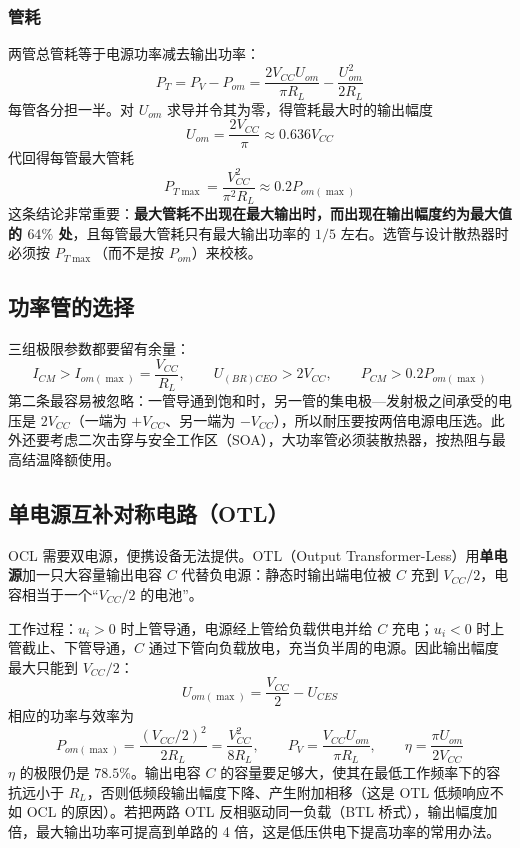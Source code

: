 \subsubsection{管耗}
两管总管耗等于电源功率减去输出功率：
\begin{equation}
P_T=P_V-P_{om}=\frac{2V_{CC}U_{om}}{\pi R_L}-\frac{U_{om}^2}{2R_L}
\end{equation}
每管各分担一半。对 $U_{om}$ 求导并令其为零，得管耗最大时的输出幅度
\begin{equation}
U_{om}=\frac{2V_{CC}}{\pi}\approx0.636V_{CC}
\end{equation}
代回得每管最大管耗
\begin{equation}
P_{T\max}=\frac{V_{CC}^2}{\pi^2R_L}\approx0.2P_{om(\max)}
\end{equation}
这条结论非常重要：\textbf{最大管耗不出现在最大输出时，而出现在输出幅度约为最大值的 $64\%$ 处}，且每管最大管耗只有最大输出功率的 $1/5$ 左右。选管与设计散热器时必须按 $P_{T\max}$（而不是按 $P_{om}$）来校核。

\subsection{功率管的选择}
三组极限参数都要留有余量：
\begin{equation}
I_{CM}>I_{om(\max)}=\frac{V_{CC}}{R_L},\qquad
U_{(BR)CEO}>2V_{CC},\qquad
P_{CM}>0.2P_{om(\max)}
\end{equation}
第二条最容易被忽略：一管导通到饱和时，另一管的集电极—发射极之间承受的电压是 $2V_{CC}$（一端为 $+V_{CC}$、另一端为 $-V_{CC}$），所以耐压要按两倍电源电压选。此外还要考虑二次击穿与安全工作区（SOA），大功率管必须装散热器，按热阻与最高结温降额使用。

\subsection{单电源互补对称电路（OTL）}
OCL 需要双电源，便携设备无法提供。OTL（Output Transformer-Less）用\textbf{单电源}加一只大容量输出电容 $C$ 代替负电源：静态时输出端电位被 $C$ 充到 $V_{CC}/2$，电容相当于一个“$V_{CC}/2$ 的电池”。

工作过程：$u_i>0$ 时上管导通，电源经上管给负载供电并给 $C$ 充电；$u_i<0$ 时上管截止、下管导通，$C$ 通过下管向负载放电，充当负半周的电源。因此输出幅度最大只能到 $V_{CC}/2$：
\begin{equation}
U_{om(\max)}=\frac{V_{CC}}{2}-U_{CES}
\end{equation}
相应的功率与效率为
\begin{equation}
P_{om(\max)}=\frac{(V_{CC}/2)^2}{2R_L}=\frac{V_{CC}^2}{8R_L},\qquad
P_V=\frac{V_{CC}U_{om}}{\pi R_L},\qquad
\eta=\frac{\pi U_{om}}{2V_{CC}}
\end{equation}
$\eta$ 的极限仍是 $78.5\%$。输出电容 $C$ 的容量要足够大，使其在最低工作频率下的容抗远小于 $R_L$，否则低频段输出幅度下降、产生附加相移（这是 OTL 低频响应不如 OCL 的原因）。若把两路 OTL 反相驱动同一负载（BTL 桥式），输出幅度加倍，最大输出功率可提高到单路的 4 倍，这是低压供电下提高功率的常用办法。


